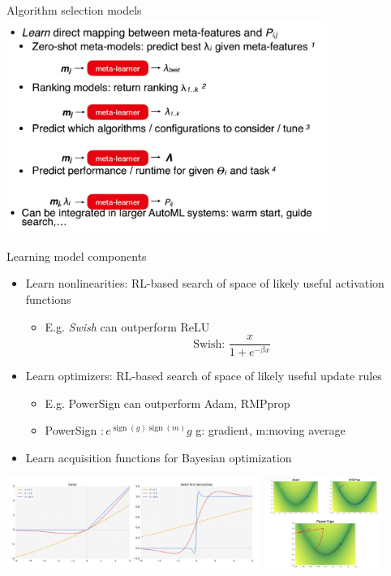 \documentclass[aspectratio=169,t,handout,xcolor={usenames,dvipsnames}]{beamer}
\begin{document}
\begin{frame}{Algorithm selection models}
    \centering\includegraphics[height=7cm]{image/Jietu20220328-233552.jpg}
\end{frame}

\begin{frame}{Learning model components}
    \begin{itemize}
        \item Learn nonlinearities: RL-based search of space of likely useful activation functions 
        \begin{itemize}
            \item E.g. \textit{Swish} can outperform ReLU
            $$  \text { Swish: } \frac{x}{1+e^{-\beta x}}$$
        \end{itemize}
        \item Learn optimizers: RL-based search of space of likely useful update rules 
        \begin{itemize}
            \item E.g. PowerSign can outperform Adam, RMPprop
            \item PowerSign $: e^{\operatorname{sign}(g) \operatorname{sign}(m)} g$
g: gradient, m:moving average
        \end{itemize}
        \item Learn acquisition functions for Bayesian optimization
    \end{itemize}
    \includegraphics[height=3cm]{image/Jietu20220328-234610.jpg}
    \includegraphics[height=3cm]{image/Jietu20220328-234631.jpg}
\end{frame}
\end{document}
